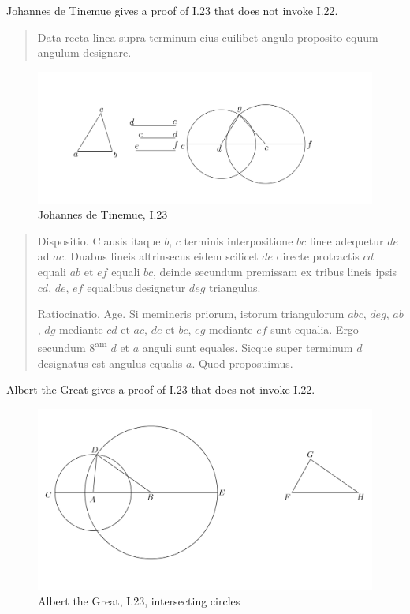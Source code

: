 \documentclass{article}
\begin{document}
Johannes de Tinemue \cite[pp.~52--53]{adelardIII} gives a proof of I.23
that does not invoke I.22.

\begin{quote}
Data recta linea supra terminum eius cuilibet angulo proposito
equum angulum designare.
\end{quote}

\begin{figure}
\begin{center}
\includegraphics[width=\textwidth]{tinemueI23}
\end{center}
\caption{Johannes de Tinemue, I.23}
\label{tinemueI23}
\end{figure}

\begin{quote}
Dispositio. Clausis itaque $b$, $c$ terminis interpositione $b c$ linee adequetur
$d e$ ad $a c$. Duabus lineis altrinsecus eidem scilicet $d e$ directe protractis
$c d$ equali $a b$ et $e f$ equali $b c$, deinde secundum premissam ex tribus lineis
ipsis $c d$, $d e$, $e f$ equalibus designetur $d e g$ triangulus.

Ratiocinatio. Age. Si memineris priorum, istorum triangulorum $a b c$,
$d e g$, $a b$, $d g$ mediante $c d$ et $a c$, $d e$ et $b c$, $e g$ mediante $e f$ sunt equalia.
Ergo secundum 8\textsuperscript{am} $d$ et $a$ anguli sunt equales. Sicque super terminum $d$
designatus est angulus equalis $a$. Quod proposuimus.
\end{quote}

Albert the Great \cite[pp.~82--84]{albertus} gives a proof of I.23 that does not invoke I.22.

\begin{figure}
\begin{center}
\includegraphics[width=\textwidth]{albertI23a.png}
\end{center}
\caption{Albert the Great, I.23, intersecting circles}
\label{albertI23a}
\end{figure}
\end{document}
